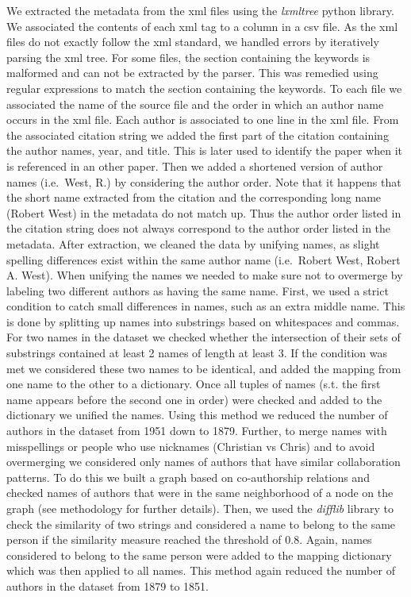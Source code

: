 \documentclass[article,twocolumn]{IEEEtran}
\begin{document}
We extracted the metadata from the xml files using the \emph{lxmltree}
python library. We associated the contents of each xml tag to a column
in a csv file. As the xml files do not exactly follow the xml standard,
we handled errors by iteratively parsing the xml tree. For some files,
the section containing the keywords is malformed and can not be
extracted by the parser. This was remedied using regular expressions to
match the section containing the keywords. To each file we associated
the name of the source file and the order in which an author name occurs
in the xml file. Each author is associated to one line in the xml file.
From the associated citation string we added the first part of the
citation containing the author names, year, and title. This is later
used to identify the paper when it is referenced in an other paper. Then
we added a shortened version of author names (i.e.~West, R.) by
considering the author order. Note that it happens that the short name
extracted from the citation and the corresponding long name (Robert
West) in the metadata do not match up. Thus the author order listed in
the citation string does not always correspond to the author order
listed in the metadata. After extraction, we cleaned the data by
unifying names, as slight spelling differences exist within the same
author name (i.e.~Robert West, Robert A. West). When unifying the names
we needed to make sure not to overmerge by labeling two different
authors as having the same name. First, we used a strict condition to
catch small differences in names, such as an extra middle name. This is
done by splitting up names into substrings based on whitespaces and
commas. For two names in the dataset we checked whether the intersection
of their sets of substrings contained at least 2 names of length at
least 3. If the condition was met we considered these two names to be
identical, and added the mapping from one name to the other to a
dictionary. Once all tuples of names (s.t. the first name appears before
the second one in order) were checked and added to the dictionary we
unified the names. Using this method we reduced the number of authors in
the dataset from 1951 down to 1879. Further, to merge names with
misspellings or people who use nicknames (Christian vs Chris) and to
avoid overmerging we considered only names of authors that have similar
collaboration patterns. To do this we built a graph based on
co-authorship relations and checked names of authors that were in the
same neighborhood of a node on the graph (see methodology for further
details). Then, we used the \emph{difflib} library to check the
similarity of two strings and considered a name to belong to the same
person if the similarity measure reached the threshold of 0.8. Again,
names considered to belong to the same person were added to the mapping
dictionary which was then applied to all names. This method again
reduced the number of authors in the dataset from 1879 to 1851.
\end{document}
